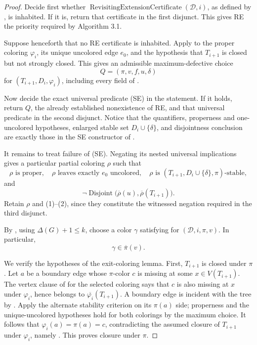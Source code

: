 \begin{proof}
Decide first whether
\(\operatorname{RevisitingExtensionCertificate}(\mathcal D,i)\), as
defined by , is inhabited.  If
it is, return that certificate in the first disjunct.  This gives RE the
priority required by Algorithm 3.1.

Suppose henceforth that no RE certificate is inhabited.  Apply
 to the proper coloring
\(\varphi_i\), its unique uncolored edge \(e_0\), and the hypothesis that
\(T_{i+1}\) is closed but not strongly closed.  This gives an admissible
maximum-defective choice
\[
                     Q=(\pi,v,f,u,\delta)
\]
for \((T_{i+1},D_i,\varphi_i)\), including every field of
.

Now decide the exact universal predicate (SE) in the statement.  If it
holds, return \(Q\), the already established nonexistence of RE, and
that universal predicate in the second disjunct.  Notice that the
quantifiers, properness and one-uncolored hypotheses, enlarged stable set
\(D_i\cup\{\delta\}\), and disjointness conclusion are exactly those in
the SE constructor of .

It remains to treat failure of (SE).  Negating its nested universal
implications gives a particular partial coloring \(\rho\) such that
\[
 \rho\text{ is proper},\quad
 \rho\text{ leaves exactly }e_0\text{ uncolored},\quad
 \rho\text{ is }(T_{i+1},D_i\cup\{\delta\},\pi)\text{-stable},
                                                                    \tag{1}
\]
and
\[
  \neg\operatorname{Disjoint}
       \bigl(\overline\rho(u),\overline\rho(T_{i+1})\bigr).     \tag{2}
\]
Retain \(\rho\) and (1)--(2), since they constitute the witnessed
negation required in the third disjunct.

By , using
\(\Delta(G)+1\leq k\), choose a color \(\gamma\) satisfying
 for \((\mathcal D,i,\pi,v)\).
In particular,
\[
                         \gamma\in\overline\pi(v).              \tag{3}
\]

We verify the hypotheses of the exit-coloring lemma.  First,
\(T_{i+1}\) is closed under \(\pi\).  Let \(a\) be a boundary edge
whose \(\pi\)-color \(c\) is missing at some \(x\in V(T_{i+1})\).
The vertex clause of  for the selected coloring
says that \(c\) is also missing at \(x\) under \(\varphi_i\), hence
belongs to \(\overline{\varphi_i}(T_{i+1})\).  A boundary edge is
incident with the tree by .  Apply the alternate
stability criterion  on its \(\pi(a)\) side; properness and
the unique-uncolored hypotheses hold for both colorings by the maximum
choice.  It follows that
\(\varphi_i(a)=\pi(a)=c\), contradicting the assumed closure of
\(T_{i+1}\) under \(\varphi_i\), namely
.  This proves closure under \(\pi\).


\end{proof}
